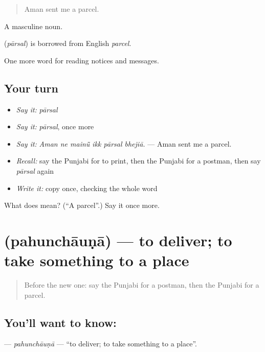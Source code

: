 \begin{quote}
Aman sent me a parcel.
\end{quote}

A masculine noun.

\begin{cousinweb}
\textbf{} (\emph{pārsal}) is borrowed from English \emph{parcel}.
\end{cousinweb}

\begin{grammarlens}[title={What you've built}]
One more word for reading notices and messages.
\end{grammarlens}

\subsection*{Your turn}
\begin{itemize}
\raggedright
  \item \emph{Say it:} \emph{pārsal}
  \item \emph{Say it:} \emph{pārsal}, once more
  \item \emph{Say it:} \emph{Aman ne mainū̃ ikk pārsal bhejiā.} — Aman sent me a parcel.
  \item \emph{Recall:} say the Punjabi for to print, then the Punjabi for a postman, then say \emph{pārsal} again
  \item \emph{Write it:} copy \textbf{} once, checking the whole word
\end{itemize}

\begin{tcolorbox}[breakable,colback=teal!4,colframe=teal!35!black,title={Before you move on}]
What does  mean? (\textquotedblleft{}A parcel\textquotedblright{}.) Say it once more.
\end{tcolorbox}
\section[\texorpdfstring{\pa{ਪਹੁੰਚਾਉਣਾ} (pahunchāuṇā)}{ਪਹੁੰਚਾਉਣਾ (pahunchāuṇā)}]{ (pahunchāuṇā) — to deliver; to take something to a place}

\label{lesson:PA-C256-pahunchauna}



\begin{quote}
Before the new one: say the Punjabi for a postman, then the Punjabi for a parcel.
\end{quote}

\subsection*{You'll want to know: }
\textbf{} — \emph{pahunchāuṇā} — \textquotedblleft{}to deliver; to take something to a place\textquotedblright{}.

